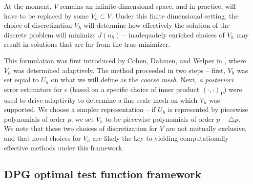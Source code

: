 \documentclass[final,leqno]{siamltex}
\newcommand{\LRp}[1]{\left( #1 \right)}
\begin{document}
At the moment, $V$ remains an infinite-dimensional space, and in practice, will have to be replaced by some $V_h\subset V$.  Under this finite dimensional setting, the choice of discretization $V_h$ will determine how effectively the solution of the discrete problem will minimize $J(u_h)$ -- inadequately enriched choices of $V_h$ may result in solutions that are far from the true minimizer.  


This formulation was first introduced by Cohen, Dahmen, and Welper in \cite{DahmenVariationalStabilization}, where $V_h$ was determined adaptively.  The method proceeded in two steps -- first, $V_h$ was set equal to $U_h$ on what we will define as the \textit{coarse mesh}.  Next, \textit{a posteriori} error estimators for $e$ (based on a specific choice of inner product $\LRp{\cdot,\cdot}_V$) were used to drive adaptivity to determine a fine-scale mesh on which $V_h$ was supported.  We choose a simpler representation -- if $U_h$ is represented by piecewise polynomials of order $p$, we set $V_h$ to be piecewise polynomials of order $p+\triangle p$.  We note that these two choices of discretization for $V$ are not mutually exclusive, and that novel choices for $V_h$ are likely the key to yielding computationally effective methods under this framework.  
\subsection{DPG optimal test function framework}
\end{document}
